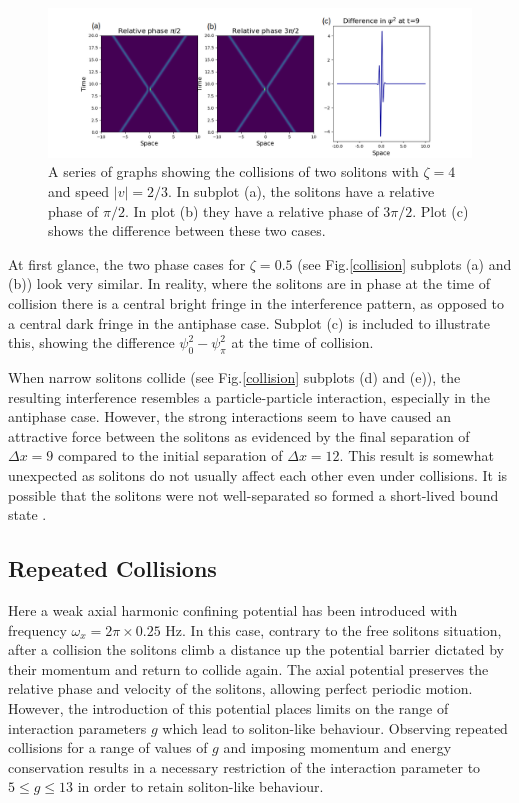\documentclass[10pt, twocolumn]{revtex4}    %
\begin{document}
\begin{figure}
\includegraphics[width=\textwidth]{asymmetrical_collision.png}
\caption{A series of graphs showing the collisions of two solitons with $\zeta=4$ and speed $|v|=2/3$. In subplot (a), the solitons have a relative phase of $\pi/2$. In plot (b) they have a relative phase of $3\pi/2$. Plot (c) shows the difference between these two cases.}
\label{asymmetric}
\end{figure}

At first glance, the two phase cases for $\zeta=0.5$ (see Fig.\ref{collision} subplots (a) and (b)) look very similar. In reality, where the solitons are in phase at the time of collision there is a central bright fringe in the interference pattern, as opposed to a central dark fringe in the antiphase case. Subplot (c) is included to illustrate this, showing the difference $\psi_0^2 - \psi_{\pi}^2$ at the time of collision. 

When narrow solitons collide (see Fig.\ref{collision} subplots (d) and (e)), the resulting interference resembles a particle-particle interaction, especially in the antiphase case. However, the strong interactions seem to have caused an attractive force between the solitons as evidenced by the final separation of $\Delta x = 9$ compared to the initial separation of $\Delta x=12$. This result is somewhat unexpected as solitons do not usually affect each other even under collisions. It is possible that the solitons were not well-separated so formed a short-lived bound state \cite{Bound}.


\subsection{Repeated Collisions}

Here a weak axial harmonic confining potential has been introduced with frequency $\omega_x = 2\pi \times 0.25$ Hz. In this case, contrary to the free solitons situation, after a collision the solitons climb a distance up the potential barrier dictated by their momentum and return to collide again. The axial potential preserves the relative phase and velocity of the solitons, allowing perfect periodic motion. However, the introduction of this potential places limits on the range of interaction parameters $g$ which lead to soliton-like behaviour. Observing repeated collisions for a range of values of $g$ and imposing momentum and energy conservation results in a necessary restriction of the interaction parameter to $5 \leq g \leq 13$ in order to retain soliton-like behaviour. 
\end{document}
